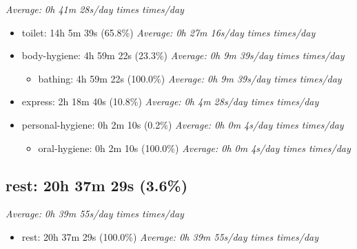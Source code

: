 \documentclass[12pt]{extarticle}
\begin{document}
\textit{Average: 0h 41m 28s/day  times  times/day}\par
\begin{itemize}[topsep=0pt, itemsep=-0.5ex]
    \item toilet: 14h 5m 39s (65.8\%)
        \textit{Average: 0h 27m 16s/day  times  times/day}\par
    \item body-hygiene: 4h 59m 22s (23.3\%)
        \textit{Average: 0h 9m 39s/day  times  times/day}\par
\begin{itemize}[topsep=0pt, itemsep=-0.5ex]
    \item bathing: 4h 59m 22s (100.0\%)
        \textit{Average: 0h 9m 39s/day  times  times/day}\par
\end{itemize}
    \item express: 2h 18m 40s (10.8\%)
        \textit{Average: 0h 4m 28s/day  times  times/day}\par
    \item personal-hygiene: 0h 2m 10s (0.2\%)
        \textit{Average: 0h 0m 4s/day  times  times/day}\par
\begin{itemize}[topsep=0pt, itemsep=-0.5ex]
    \item oral-hygiene: 0h 2m 10s (100.0\%)
        \textit{Average: 0h 0m 4s/day  times  times/day}\par
\end{itemize}
\end{itemize}
{\fontsize{16}{19.2}\selectfont\subsection*{rest: 20h 37m 29s (3.6\%)}}
\textit{Average: 0h 39m 55s/day  times  times/day}\par
\begin{itemize}[topsep=0pt, itemsep=-0.5ex]
    \item rest: 20h 37m 29s (100.0\%)
        \textit{Average: 0h 39m 55s/day  times  times/day}\par
\end{itemize}
\end{document}

